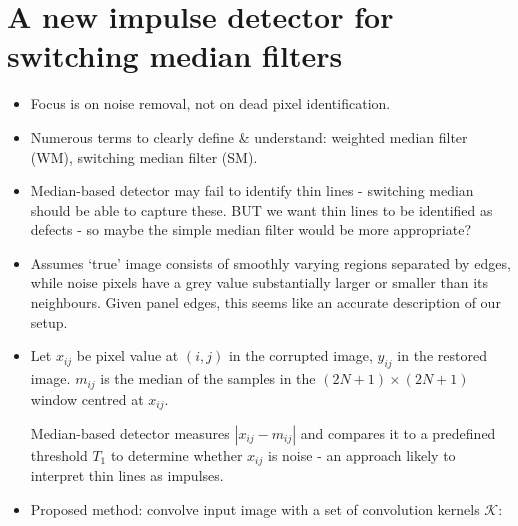 \documentclass[10pt,fleqn]{article}
\begin{document}
\section{A new impulse detector for switching median filters \cite{Zhang2002}}

\begin{itemize}

\item Focus is on noise removal, not on dead pixel identification.

\item Numerous terms to clearly define \& understand: weighted median filter (WM), switching median filter (SM).

\item Median-based detector may fail to identify thin lines - switching median should be able to capture these. BUT we want thin lines to be identified as defects - so maybe the simple median filter would be more appropriate?

\item Assumes `true' image consists of smoothly varying regions separated by edges, while noise pixels have a grey value substantially larger or smaller than its neighbours. Given panel edges, this seems like an accurate description of our setup.

\item Let $x_{ij}$ be pixel value at $(i,j)$ in the corrupted image,  $y_{ij}$ in the restored image. $m_{ij}$ is the median of the samples in the $(2N+1)\times (2N+1)$  window centred at $x_{ij}$.

Median-based detector \cite{Sun1994} measures $|x_{ij} - m_{ij}|$ and compares it to a predefined threshold $T_1$ to determine whether $x_{ij}$ is noise - an approach likely to interpret thin lines as impulses.

\item Proposed method: convolve input image with a set of convolution kernels $\mathcal{K}$:


\end{itemize}
\end{document}
